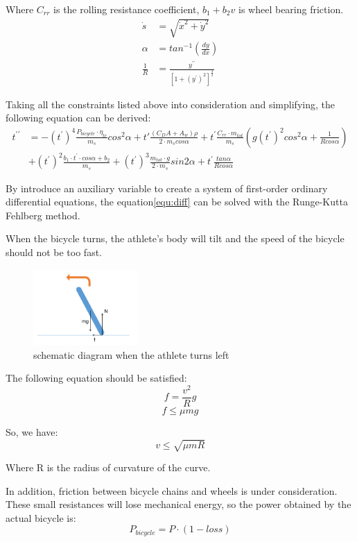 \documentclass{mcmthesis}
\begin{document}
\par
Where $C_{rr}$ is the rolling resistance coefficient, $b_1+b_2v$  is wheel bearing friction.
\begin{align}
    \dot{s}&=\sqrt{ \dot{x}^2+\dot{y}^2}\\
    \alpha&= tan^{-1}(\frac{dy}{dx})\\
    \frac{1}{R}&=\frac{y^{\prime\prime}}{[1+(y^\prime)^2]^{\frac{3}{2}}}
\end{align}
\par
Taking all the constraints listed above into consideration and simplifying, the following equation can be derived\cite{sundstrom_optimization_2013}: 
\begin{equation}
\begin{aligned}
    t^{\prime\prime}&= -(t^\prime)^4\frac{P_{bicycle}\cdot \eta_{tr}}{m_s}cos^2\alpha+t\prime \frac{(C_DA+A_w)\rho}{2\cdot m_s cos\alpha  }+t^\prime\frac{C_{rr}\cdot m_{tot}}{m_s}(g(t^\prime)^2cos^2\alpha+\frac{1}{Rcos\alpha})\\
    &+(t^\prime)^2\frac{b_1\cdot t^\prime \cdot cos\alpha +b_2}{m_s}+(t^\prime)^3\frac{m_{tot}\cdot g}{2\cdot m_s}sin2\alpha+t^\prime \frac{tan\alpha}{Rcos\alpha}
\end{aligned}
\label{equ:diff}
\end{equation}
\par
By introduce an auxiliary variable
to create a system of first-order ordinary differential equations, the equation\ref{equ:diff} can be solved with the Runge-Kutta Fehlberg method\cite{sreedhara_survey_2019}.
\par
When the bicycle turns, the athlete's body will tilt and the speed of the bicycle should not be too fast.
\begin{figure}[H]
\small
\centering
\includegraphics[width=4cm]{mcmthesis/figures/turn left.png}
\caption{schematic diagram when the athlete turns left} 
\end{figure}
\par
The following equation should be satisfied:
\begin{equation}
    f=\frac{v^2}{R}g
\end{equation}
\begin{equation}
    f\leq \mu mg
\end{equation}
\par
So, we have:
\begin{equation}
    v\leq \sqrt{\mu mR}
\end{equation}
\par
Where R is the radius of curvature of the curve.
\par
In addition, friction between bicycle chains and wheels is under consideration. These small resistances will lose mechanical energy, so the power obtained by the actual bicycle is:
\begin{equation}
    P_{bicycle}=P\cdot (1-loss)
\end{equation}
\end{document}
